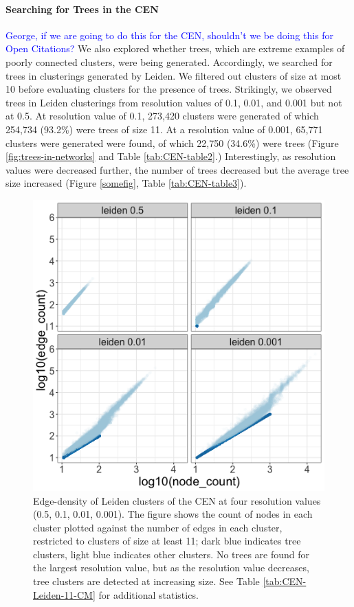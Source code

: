 \documentclass[11pt]{article}   	%
\begin{document}
\paragraph{Searching for Trees in the CEN}
\textcolor{blue}{George, if we are going to do this for the CEN, shouldn't we be doing this for Open Citations? }
We also explored whether trees, which are extreme examples of poorly connected clusters, were being generated. Accordingly, we searched for trees in clusterings generated by  Leiden.
We filtered out clusters of size at most 10 before evaluating clusters for the presence of trees. Strikingly, we observed trees in Leiden clusterings from resolution values of 0.1, 0.01, and 0.001 but not at 0.5. At resolution value of 0.1, 273,420 clusters were generated of which 254,734 (93.2\%) were trees of size 11. At a resolution value of 0.001, 65,771 clusters were generated were found, of which 22,750 (34.6\%) were
trees (Figure \ref{fig:trees-in-networks} and Table \ref{tab:CEN-table2}.)
 Interestingly, as resolution values were decreased further, the number of trees decreased but the average tree size increased (Figure \ref{somefig}, Table \ref{tab:CEN-table3}).

\begin{figure}[h]
\centering
\includegraphics[width=0.4\linewidth]{figs/cen_quad_fig1.png}
\caption{Edge-density of Leiden clusters of the CEN at four resolution values (0.5, 0.1, 0.01, 0.001).
The figure shows the count of nodes in each cluster plotted against the number of edges in each cluster, restricted to clusters of size at least 11;  dark blue indicates tree clusters, light blue indicates other clusters.
No trees are found for the largest resolution value, but as the resolution value decreases, tree clusters are detected at increasing size.
See Table   \ref{tab:CEN-Leiden-11-CM} for additional statistics.}
\label{fig:Leiden-CEN-trees}
\end{figure}
\end{document}

